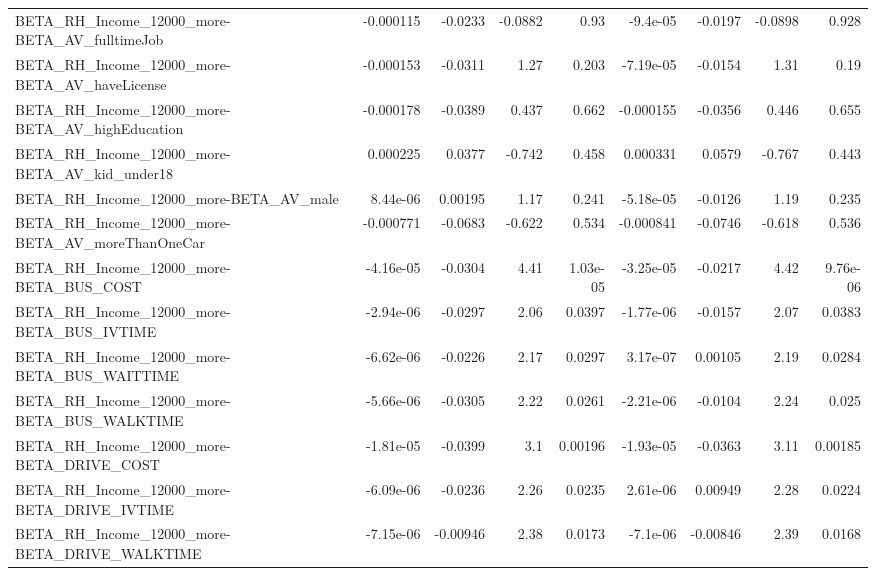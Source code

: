 \begin{tabular}{lrrrrrrrr}
BETA\_RH\_Income\_12000\_more-BETA\_AV\_fulltimeJob      &   -0.000115 &      -0.0233 &  -0.0882 &     0.93 &   -9.4e-05 &     -0.0197 &      -0.0898 &         0.928 \\
BETA\_RH\_Income\_12000\_more-BETA\_AV\_haveLicense      &   -0.000153 &      -0.0311 &     1.27 &    0.203 &  -7.19e-05 &     -0.0154 &         1.31 &          0.19 \\
BETA\_RH\_Income\_12000\_more-BETA\_AV\_highEducation    &   -0.000178 &      -0.0389 &    0.437 &    0.662 &  -0.000155 &     -0.0356 &        0.446 &         0.655 \\
BETA\_RH\_Income\_12000\_more-BETA\_AV\_kid\_under18      &    0.000225 &       0.0377 &   -0.742 &    0.458 &   0.000331 &      0.0579 &       -0.767 &         0.443 \\
BETA\_RH\_Income\_12000\_more-BETA\_AV\_male             &    8.44e-06 &      0.00195 &     1.17 &    0.241 &  -5.18e-05 &     -0.0126 &         1.19 &         0.235 \\
BETA\_RH\_Income\_12000\_more-BETA\_AV\_moreThanOneCar   &   -0.000771 &      -0.0683 &   -0.622 &    0.534 &  -0.000841 &     -0.0746 &       -0.618 &         0.536 \\
BETA\_RH\_Income\_12000\_more-BETA\_BUS\_COST            &   -4.16e-05 &      -0.0304 &     4.41 & 1.03e-05 &  -3.25e-05 &     -0.0217 &         4.42 &      9.76e-06 \\
BETA\_RH\_Income\_12000\_more-BETA\_BUS\_IVTIME          &   -2.94e-06 &      -0.0297 &     2.06 &   0.0397 &  -1.77e-06 &     -0.0157 &         2.07 &        0.0383 \\
BETA\_RH\_Income\_12000\_more-BETA\_BUS\_WAITTIME        &   -6.62e-06 &      -0.0226 &     2.17 &   0.0297 &   3.17e-07 &     0.00105 &         2.19 &        0.0284 \\
BETA\_RH\_Income\_12000\_more-BETA\_BUS\_WALKTIME        &   -5.66e-06 &      -0.0305 &     2.22 &   0.0261 &  -2.21e-06 &     -0.0104 &         2.24 &         0.025 \\
BETA\_RH\_Income\_12000\_more-BETA\_DRIVE\_COST          &   -1.81e-05 &      -0.0399 &      3.1 &  0.00196 &  -1.93e-05 &     -0.0363 &         3.11 &       0.00185 \\
BETA\_RH\_Income\_12000\_more-BETA\_DRIVE\_IVTIME        &   -6.09e-06 &      -0.0236 &     2.26 &   0.0235 &   2.61e-06 &     0.00949 &         2.28 &        0.0224 \\
BETA\_RH\_Income\_12000\_more-BETA\_DRIVE\_WALKTIME      &   -7.15e-06 &     -0.00946 &     2.38 &   0.0173 &   -7.1e-06 &    -0.00846 &         2.39 &        0.0168 \\

\end{tabular}
